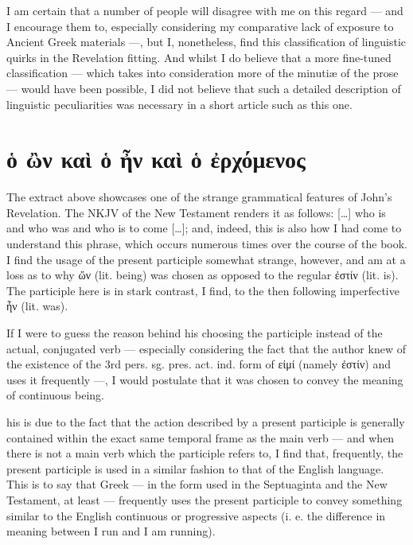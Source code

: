 I am certain that a number of people will disagree with me on this regard — and I encourage them to, especially considering my comparative lack of exposure to Ancient Greek materials —, but I, nonetheless, find this classification of linguistic quirks in the Revelation fitting. And whilst I do believe that a more fine-tuned classification — which takes into consideration more of the minutiæ of the prose — would have been possible, I did not believe that such a detailed description of linguistic peculiarities was necessary in a short article such as this one.

\section*{ὁ ὢν καὶ ὁ ἦν καὶ ὁ ἐρχόμενος}
  
The extract above showcases one of the strange grammatical features of John’s Revelation. The NKJV of the New Testament renders it as follows: […] who is and who was and who is to come […]; and, indeed, this is also how I had come to understand this phrase, which occurs numerous times over the course of the book. I find the usage of the present participle somewhat strange, however, and am at a loss as to why ὤν (lit. being) was chosen as opposed to the regular ἐστίν (lit. is). The participle here is in stark contrast, I find, to the then following imperfective ἦν (lit. was).

If I were to guess the reason behind his choosing the participle instead of the actual, conjugated verb — especially considering the fact that the author knew of the existence of the 3rd pers. sg. pres. act. ind. form of εἰμί (namely ἐστίν) and uses it frequently —, I would postulate that it was chosen to convey the meaning of continuous being.

his is due to the fact that the action described by a present participle is generally contained within the exact same temporal frame as the main verb — and when there is not a main verb which the participle refers to, I find that, frequently, the present participle is used in a similar fashion to that of the English language. This is to say that Greek — in the form used in the Septuaginta and the New Testament, at least — frequently uses the present participle to convey something similar to the English continuous or progressive aspects (i. e. the difference in meaning between I run and I am running).

